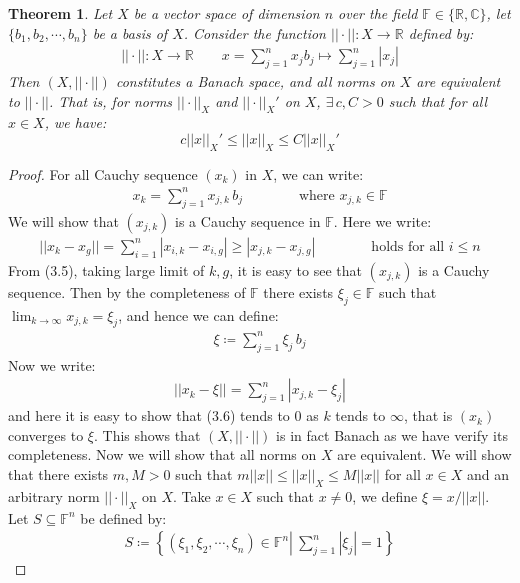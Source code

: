 \documentclass[11pt]{book}
\theoremstyle{break}
\theoremstyle{break}
\newtheorem{thm}{Theorem}[section]
\newcommand{\R}{\mathbb{R}}
\newcommand{\C}{\mathbb{C}}
\begin{document}
\newpage
\begin{thm}
Let $X$ be a vector space of dimension $n$ over the field $\mathbb{F} \in \{\R,\C\}$, let $\{b_1,b_2,\cdots, b_n\}$ be a basis of $X$. Consider the function $||\cdot ||:X \to \R$ defined by:
\begin{align*}
||\cdot ||:X \to \R\qquad x=\sum_{j=1}^n x_j b_j \mapsto \sum_{j=1}^n |x_j|
\end{align*}
Then $(X,||\cdot ||)$ constitutes a Banach space, and all norms on $X$ are equivalent to $||\cdot ||$. That is, for norms $||\cdot ||_X$ and $||\cdot ||_X'$ on $X$, $\exists\, c,C >0$ such that for all $x \in X$, we have: $$c||x||_X' \leq ||x ||_X \leq C||x||_X'$$
\end{thm}
\begin{proof}
For all Cauchy sequence $(x_k)$ in $X$, we can write:
\begin{align*}
x_k = \sum_{j=1}^n x_{j,k}\, b_j \qquad\qquad\text{where }x_{j,k}\in \mathbb{F}
\end{align*}
We will show that $(x_{j,k})$ is a Cauchy sequence in $\mathbb{F}$. Here we write:
\begin{align}
||x_k - x_g|| = \sum_{i=1}^n |x_{i,k}-x_{i,g}| \geq |x_{j,k}-x_{j,g}|\qquad\qquad \text{holds for all }i \leq n
\end{align}
From (3.5), taking large limit of $k,g$, it is easy to see that $(x_{j,k})$ is a Cauchy sequence. Then by the completeness of $\mathbb{F}$ there exists $\xi_j \in \mathbb{F}$ such that $\lim_{k\to \infty} x_{j,k} = \xi_j$, and hence we can define:
\begin{align*}
\xi \coloneqq \sum_{j=1}^n \xi_j \, b_j
\end{align*}
Now we write:
\begin{align}
||x_k - \xi|| = \sum_{j=1}^n |x_{j,k}-\xi_j|
\end{align}
and here it is easy to show that (3.6) tends to $0$ as $k$ tends to $\infty$, that is $(x_k)$ converges to $\xi$. This shows that $(X,||\cdot||)$ is in fact Banach as we have verify its completeness. Now we will show that all norms on $X$ are equivalent. We will show that there exists $m,M>0$ such that $m||x|| \leq ||x||_X \leq M||x||$ for all $x \in X$ and an arbitrary norm $||\cdot ||_X$ on $X$. Take $x \in X$ such that $x \neq 0$, we define $\xi = x/||x||$. Let $S \subseteq \mathbb{F}^n$ be defined by:
\begin{align*}
S \coloneqq \left\{ (\xi_1,\xi_2,\cdots, \xi_n) \in \mathbb{F}^n \left|\ \sum_{j=1}^n |\xi_j| = 1\right.\right\}
\end{align*}

\end{proof}
\end{document}
